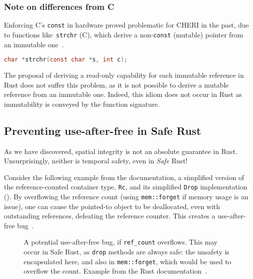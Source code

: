 \documentclass[dissertation.tex]{subfiles}
\begin{document}
\subsubsection{Note on differences from C}
Enforcing C's \texttt{const} in hardware proved problematic for CHERI in
the past, due to functions like~\texttt{strchr} (C), which derive a
non-\texttt{const} (mutable) pointer from an immutable
one~\cite{cheri-prog-guide}.

\begin{lstlisting}[language=C]
char *strchr(const char *s, int c);
\end{lstlisting}

The proposal of deriving a read-only capability for each immutable
reference in Rust does not suffer this problem, as it is not possible to
derive a mutable reference from an immutable one.
Indeed, this idiom does not occur in Rust as immutability is conveyed by
the function signature.


\subsection{Preventing use-after-free in Safe Rust}
\label{sec:eval-rust-use-after-free}

As we have discovered, spatial integrity is not an absolute guarantee in
Rust.
Unsurprisingly, neither is temporal safety, even in \emph{Safe} Rust!

Consider the following example from the documentation, a simplified
version of the reference-counted container type, \texttt{Rc}, and its
simplified \texttt{Drop} implementation ().
By overflowing the reference count (using \texttt{mem::forget} if memory
usage is an issue), one can cause the pointed-to object to be
deallocated, even with outstanding references, defeating the reference
counter.
This creates a use-after-free bug~\cite{rust-nomicon-rc-leak}.

\begin{figure}[ht]
    
    \caption{
        A potential use-after-free bug, if \texttt{ref\_count}
        overflows.
        This may occur in Safe Rust, as \texttt{drop} methods are always
        safe: the unsafety is encapsulated here, and also in
        \texttt{mem::forget}, which would be used to overflow the count.
        Example from the Rust documentation~\cite{rust-nomicon-rc-leak}.
    }
    \label{lst:eval-rust-rc-drop}
\end{figure}
\end{document}
